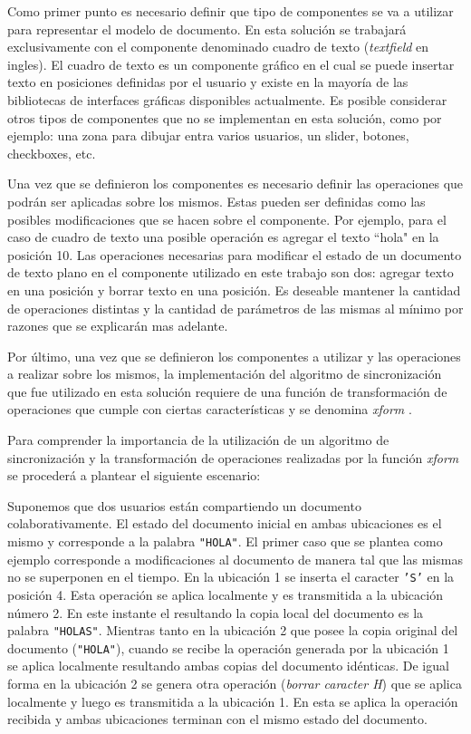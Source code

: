 \documentclass[12pt,a4paper]{article}
\begin{document}
	Como primer punto es necesario definir que tipo de componentes se va a utilizar para representar el modelo
	de documento. En esta solución se trabajará exclusivamente con el componente denominado cuadro de texto
	(\textit{textfield} en ingles). El cuadro de texto es un componente gráfico en el cual se puede insertar texto en 
	posiciones definidas por el usuario y existe en la mayoría de las bibliotecas de interfaces gráficas 
	disponibles actualmente. Es posible considerar otros tipos de componentes que no se implementan en esta
	solución, como por ejemplo: una zona para dibujar entra varios usuarios, un slider, botones, checkboxes, etc.
	
	Una vez que se definieron los componentes es necesario definir las operaciones que podrán ser aplicadas sobre
	los mismos. Estas pueden ser definidas como las posibles modificaciones que se hacen sobre el componente.
	Por ejemplo, para el caso de cuadro de texto una posible operación es agregar el texto \textsf{``hola"} 
	en la posición 10.
	Las operaciones necesarias para modificar el estado de un documento de texto plano en el componente utilizado
	en este trabajo son	dos: agregar texto en una posición y borrar texto en una posición.
	Es deseable mantener la cantidad de operaciones distintas y la cantidad de parámetros de las mismas al
	mínimo por razones que se explicarán mas adelante.

	Por último, una vez que se definieron los componentes a utilizar y las operaciones a realizar sobre los mismos,
	la implementación del algoritmo de sincronización que fue utilizado en esta solución requiere de una función 
	de transformación de operaciones que cumple con ciertas características y se denomina
	\textit{xform } \cite{jupiter}. 

	Para comprender la importancia de la utilización de un algoritmo de sincronización y la transformación
	de operaciones realizadas por la función \textit{xform }se procederá a plantear el siguiente escenario:
	
	Suponemos que dos usuarios están compartiendo un documento colaborativamente. El estado del documento 
	inicial en ambas ubicaciones es el mismo y corresponde a la palabra \texttt{"HOLA"}.
	El primer caso que se plantea como ejemplo corresponde a modificaciones al documento de manera tal 
	que las mismas no se superponen en el tiempo.
	En la ubicación 1 se inserta el caracter \texttt{'S'} en la posición 4. Esta operación se aplica localmente
	y es transmitida a la ubicación número 2. En este instante el resultando la copia local del documento es
	la palabra \texttt{"HOLAS"}.
	Mientras tanto en la ubicación 2 que posee la copia original del documento (\texttt{"HOLA"}), cuando se recibe
	la operación generada por la ubicación 1 se aplica localmente resultando ambas copias del documento idénticas.
	De igual forma en la ubicación 2 se genera otra operación (\textit{borrar caracter H}) que se aplica localmente
	y luego es transmitida a la ubicación 1. En esta se aplica la operación recibida y ambas ubicaciones terminan 
	con el mismo estado del documento.
	
\end{document}
